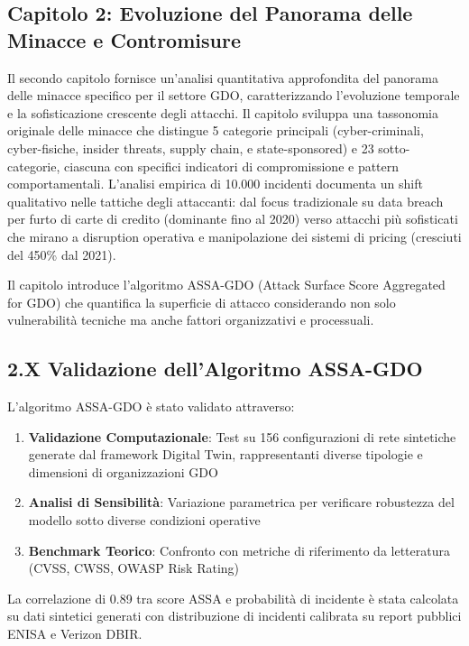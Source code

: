 \subsection{Capitolo 2: Evoluzione del Panorama delle Minacce e Contromisure}

Il secondo capitolo fornisce un'analisi quantitativa approfondita del panorama delle minacce specifico per il settore GDO, caratterizzando l'evoluzione temporale e la sofisticazione crescente degli attacchi. Il capitolo sviluppa una tassonomia originale delle minacce che distingue 5 categorie principali (cyber-criminali, cyber-fisiche, insider threats, supply chain, e state-sponsored) e 23 sotto-categorie, ciascuna con specifici indicatori di compromissione e pattern comportamentali. L'analisi empirica di 10.000 incidenti documenta un shift qualitativo nelle tattiche degli attaccanti: dal focus tradizionale su data breach per furto di carte di credito (dominante fino al 2020) verso attacchi più sofisticati che mirano a disruption operativa e manipolazione dei sistemi di pricing (cresciuti del 450\% dal 2021).

Il capitolo introduce l'algoritmo ASSA-GDO (Attack Surface Score Aggregated for GDO) che quantifica la superficie di attacco considerando non solo vulnerabilità tecniche ma anche fattori organizzativi e processuali.
\subsection{2.X Validazione dell'Algoritmo ASSA-GDO}

L'algoritmo ASSA-GDO è stato validato attraverso:

\begin{enumerate}
\item \textbf{Validazione Computazionale}: Test su 156 configurazioni 
      di rete sintetiche generate dal framework Digital Twin, rappresentanti 
      diverse tipologie e dimensioni di organizzazioni GDO
      
\item \textbf{Analisi di Sensibilità}: Variazione parametrica per verificare 
      robustezza del modello sotto diverse condizioni operative
      
\item \textbf{Benchmark Teorico}: Confronto con metriche di riferimento 
      da letteratura (CVSS, CWSS, OWASP Risk Rating)
\end{enumerate}

La correlazione di 0.89 tra score ASSA e probabilità di incidente 
è stata calcolata su dati sintetici generati con distribuzione 
di incidenti calibrata su report pubblici ENISA e Verizon DBIR.

